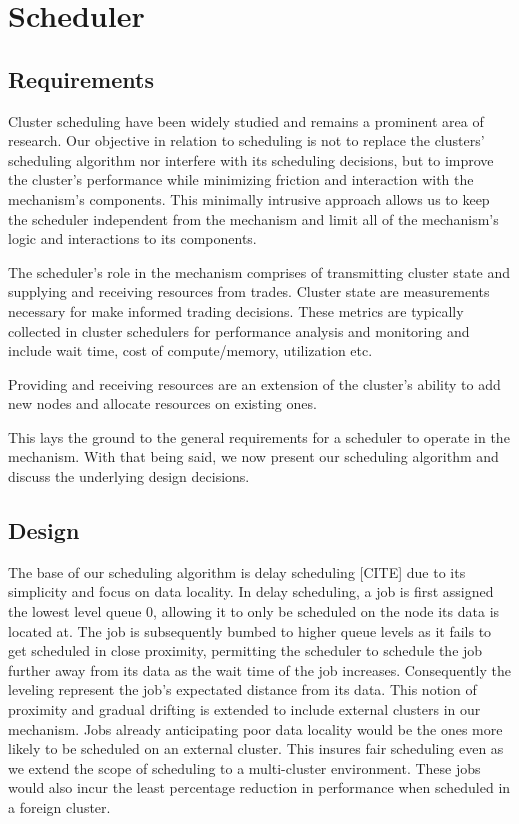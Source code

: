 \section{Scheduler}
\subsection{Requirements}

Cluster scheduling have been widely studied and remains a prominent area of
research. Our objective in relation to scheduling is not to replace the
clusters' scheduling algorithm nor interfere with its scheduling decisions, but
to improve the cluster's performance while minimizing friction and interaction
with the mechanism's components. This minimally intrusive approach allows us to
keep the scheduler independent from the mechanism and limit all of the
mechanism's logic and interactions to its components.

The scheduler's role in the mechanism comprises of transmitting cluster state
and supplying and receiving resources from trades. Cluster state are
measurements necessary for make informed trading decisions. These metrics are
typically collected in cluster schedulers for performance analysis and
monitoring and include wait time, cost of compute/memory, utilization etc.

\noindent Providing and receiving resources are an extension of the cluster's
ability to add new nodes and allocate resources on existing ones. 


This lays the ground to the general requirements for a scheduler to operate in
the mechanism. With that being said, we now present our scheduling algorithm
and discuss the underlying design decisions. 

\subsection{Design}

The base of our scheduling algorithm is delay scheduling [CITE] due to its
simplicity and focus on data locality. In delay scheduling, a job is first
assigned the lowest level queue 0, allowing it to only be scheduled on the node
its data is located at. The job is subsequently bumbed to higher queue levels as it
fails to get scheduled in close proximity, permitting the scheduler to
schedule the job further away from its data as the wait time of the job
increases. Consequently the leveling represent the job's expectated distance
from its data. This notion of proximity and gradual drifting is extended to
include external clusters in our mechanism. Jobs already anticipating poor data
locality would be the ones more likely to be scheduled on an external cluster.
This insures fair scheduling even as we extend the scope of scheduling to a
multi-cluster environment. These jobs would also incur the least percentage
reduction in performance when scheduled in a foreign cluster.

